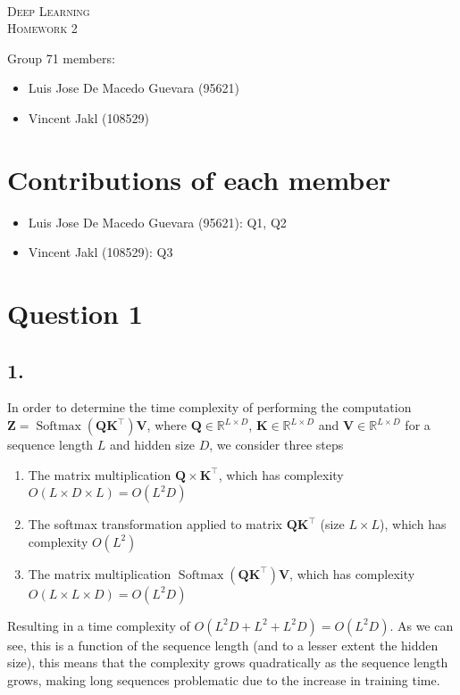 \documentclass[11pt]{article}
\DeclareMathOperator{\softmax}{Softmax}
\begin{document}
\begin{center}
  \mbox{}\\[2.0cm]
  \textsc{\Huge Deep Learning}\\[1.0cm]
  \textsc{\Large Homework 2}\\[0.5cm]
\end{center}
\begin{flushleft}
  Group 71 members: \\[0.5cm]
  \begin{itemize}
  \item Luis Jose De Macedo Guevara (95621)
  \item Vincent Jakl (108529)
  \end{itemize}
\end{flushleft}

\section{Contributions of each member}
\begin{itemize}
    \item Luis Jose De Macedo Guevara (95621): Q1, Q2
    \item Vincent Jakl (108529): Q3
\end{itemize}
\pagebreak
\section{Question 1}
\subsection{1.}
In order to determine the time complexity of performing the computation $\bm{Z} = \softmax \left( \bm{Q} \bm{K}^{\top} \right) \bm{V}$, where $\bm{Q} \in \mathbb{R}^{L \times D}$, $\bm{K} \in \mathbb{R}^{L \times D}$ and $\bm{V} \in \mathbb{R}^{L \times D}$ for a sequence length $L$ and hidden size $D$, we consider three steps
\begin{enumerate}
\item The matrix multiplication $\bm{Q} \times \bm{K}^{\top}$, which has complexity $O \left( L \times D \times L \right) = O \left( L^{2} D \right)$
\item The softmax transformation applied to matrix $\bm{Q} \bm{K}^{\top}$ (size $L \times L$), which has complexity $O \left( L^{2} \right)$
\item The matrix multiplication $\softmax \left( \bm{Q} \bm{K}^{\top} \right) \bm{V}$, which has complexity $O \left( L \times L \times D \right) = O \left( L^{2} D \right)$
\end{enumerate}
Resulting in a time complexity of $O \left( L^{2}D + L^{2} + L^{2}D \right) = O \left( L^{2} D \right)$. As we can see, this is a function of the sequence length (and to a lesser extent the hidden size), this means that the complexity grows quadratically as the sequence length grows, making long sequences problematic due to the increase in training time.
\end{document}
